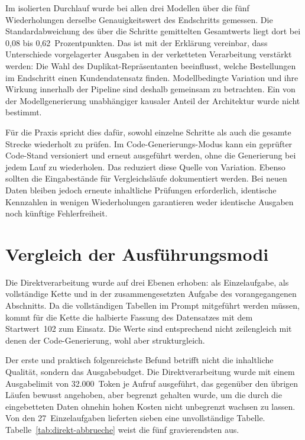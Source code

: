 Im isolierten Durchlauf wurde bei allen drei Modellen über die fünf Wiederholungen derselbe Genauigkeitswert des Endschritts gemessen. Die Standardabweichung des über die Schritte gemittelten Gesamtwerts liegt dort bei 0,08 bis 0,62~Prozentpunkten. Das ist mit der Erklärung vereinbar, dass Unterschiede vorgelagerter Ausgaben in der verketteten Verarbeitung verstärkt werden: Die Wahl des Duplikat-Repräsentanten beeinflusst, welche Bestellungen im Endschritt einen Kundendatensatz finden. Modellbedingte Variation und ihre Wirkung innerhalb der Pipeline sind deshalb gemeinsam zu betrachten. Ein von der Modellgenerierung unabhängiger kausaler Anteil der Architektur wurde nicht bestimmt.

Für die Praxis spricht dies dafür, sowohl einzelne Schritte als auch die gesamte Strecke wiederholt zu prüfen. Im Code-Generierungs-Modus kann ein geprüfter Code-Stand versioniert und erneut ausgeführt werden, ohne die Generierung bei jedem Lauf zu wiederholen. Das reduziert diese Quelle von Variation. Ebenso sollten die Eingabestände für Vergleichsläufe dokumentiert werden. Bei neuen Daten bleiben jedoch erneute inhaltliche Prüfungen erforderlich, identische Kennzahlen in wenigen Wiederholungen garantieren weder identische Ausgaben noch künftige Fehlerfreiheit.

\section{Vergleich der Ausführungsmodi}
\label{sec:vergleich-modi}

Die Direktverarbeitung wurde auf drei Ebenen erhoben: als Einzelaufgabe, als vollständige Kette und in der zusammengesetzten Aufgabe des vorangegangenen Abschnitts. Da die vollständigen Tabellen im Prompt mitgeführt werden müssen, kommt für die Kette die halbierte Fassung des Datensatzes mit dem Startwert~102 zum Einsatz. Die Werte sind entsprechend nicht zeilengleich mit denen der Code-Generierung, wohl aber strukturgleich.

Der erste und praktisch folgenreichste Befund betrifft nicht die inhaltliche Qualität, sondern das Ausgabebudget. Die Direktverarbeitung wurde mit einem Ausgabelimit von 32.000~Token je Aufruf ausgeführt, das gegenüber den übrigen Läufen bewusst angehoben, aber begrenzt gehalten wurde, um die durch die eingebetteten Daten ohnehin hohen Kosten nicht unbegrenzt wachsen zu lassen. Von den 27~Einzelaufgaben lieferten sieben eine unvollständige Tabelle. Tabelle~\ref{tab:direkt-abbrueche} weist die fünf gravierendsten aus.

